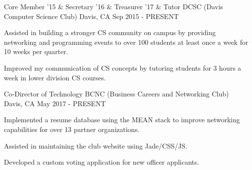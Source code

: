 

\begin{cventries}

  \cventry
    {Core Member '15 \& Secretary '16 \& Treasurer '17 \& Tutor} %
    {DCSC (Davis Computer Science Club)} %
    {Davis, CA} %
    {Sep 2015 - PRESENT} %
    {
      \begin{cvitems} %
        \item {Assisted in building a stronger CS community on campus by providing networking and programming events to over 100 students at least once a week for 10 weeks per quarter.}
        \item {Improved my communication of CS concepts by tutoring students for 3 hours a week in lower division CS courses.}
      \end{cvitems}
    }

  \cventry
    {Co-Director of Technology} %
    {BCNC (Business Careers and Networking Club)} %
    {Davis, CA} %
    {May 2017 - PRESENT} %
    {
      \begin{cvitems} %
        \item {Implemented a resume database using the MEAN stack to improve networking capabilities for over 13 partner organizations.}
        \item {Assisted in maintaining the club website using Jade/CSS/JS.}
        \item {Developed a custom voting application for new officer applicants.}
      \end{cvitems}
    }

\end{cventries}
